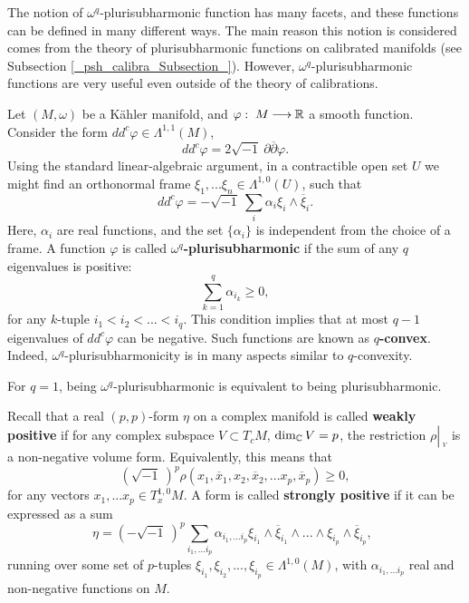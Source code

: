 \documentclass[11pt]{article}
\numberwithin{equation}{section}
\newcommand{\arrow}{{\:\longrightarrow\:}}
\newcommand{\C}{{\Bbb C}}
\newcommand{\R}{{\Bbb R}}
\newcommand{\6}{\partial}
\def\1{\sqrt{-1}\:}
\newcommand{\restrict}[1]{{\left|_{{\phantom{|}\!\!}_{#1}}\right.}}
\renewcommand{\bar}{\overline}
\renewcommand{\phi}{\varphi}
\renewcommand{\geq}{\geqslant}
\begin{document}
The notion of $\omega^q$-plurisubharmonic function has
many facets, and these functions can be defined in many
different ways. The main reason this notion is considered
comes from the theory of plurisubharmonic functions
on calibrated manifolds (see Subsection
\ref{_psh_calibra_Subsection_}). However,
$\omega^q$-plurisubharmonic functions are
very useful even outside of the theory of 
calibrations.

Let $(M, \omega)$ be a K\"ahler manifold,
and $\phi:\; M \arrow \R$ a smooth function.
Consider the form $dd^c\phi \in \Lambda^{1,1}(M)$,
\[
dd^c\phi = 2 \1 \6\bar\6 \phi.
\]
Using the standard linear-algebraic argument,
in a contractible open set $U$ we might find an orthonormal frame
$ \xi_1, ... \xi_n \in \Lambda^{1,0}(U)$, such that
\begin{equation}\label{_dd^c_locally_ortho_Equation_}
dd^c\phi = -\1\sum_i \alpha_i \xi_i\wedge\bar\xi_i.
\end{equation}
Here, $\alpha_i$ are real functions,
and the set $\{\alpha_i\}$ is independent from the
choice of a frame.
A function $\phi$ is called {\bf $\omega^q$-plurisubharmonic}
if the sum of any $q$ eigenvalues is positive:
\begin{equation}\label{_sum_smallest_Equation_}
\sum_{k=1}^q \alpha_{i_k} \geq 0,
\end{equation}
for any $k$-tuple $i_1 < i_2 < ... < i_q$. 
This condition implies that at most $q-1$ eigenvalues
of $dd^c\phi$ can be negative. Such functions are known
as {\bf $q$-convex}. Indeed,
$\omega^q$-plurisubharmonicity
is in many aspects similar to $q$-convexity.

For $q=1$, being $\omega^q$-plurisubharmonic
is equivalent to being plurisubharmonic.

Recall that a real $(p,p)$-form $\eta$
on a complex manifold is called {\bf weakly positive}
if for any complex subspace $V\subset T_c M$, 
$\dim_\C V=p$, the restriction $\rho\restrict V$
is a non-negative volume form. Equivalently,
this means that 
\[ 
  (\1)^p\rho(x_1, \bar x_1, x_2, \bar x_2, ... x_p, \bar
  x_p)\geq 0,
\]
for any vectors $x_1, ... x_p\in T_x^{1,0}M$.
A form is called {\bf strongly positive} if it can 
be expressed as a sum
\[
\eta = (-\1)^p\sum_{i_1, ... i_p} 
\alpha_{i_1, ... i_p} \xi_{i_1} \wedge \bar\xi_{i_1}\wedge ... 
\wedge \xi_{i_p} \wedge \bar\xi_{i_p}, \ \  
\]
running over some set of $p$-tuples 
$\xi_{i_1}, \xi_{i_2}, ..., \xi_{i_p}\in \Lambda^{1,0}(M)$,
with $\alpha_{i_1, ... i_p}$ real and non-negative functions on $M$.
\end{document}
